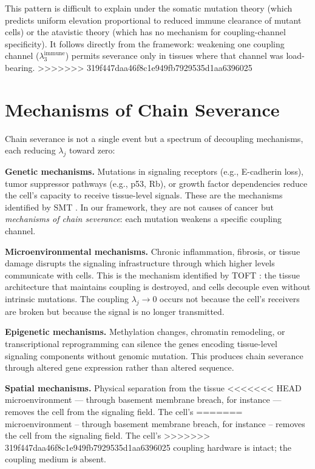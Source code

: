 \documentclass[11pt]{article}
\theoremstyle{definition}
\theoremstyle{remark}
\begin{document}
This pattern is difficult to explain under the somatic mutation
theory (which predicts uniform elevation proportional to reduced
immune clearance of mutant cells) or the atavistic theory (which
has no mechanism for coupling-channel specificity). It follows
directly from the framework: weakening one coupling channel
($\lambda_3^{\mathrm{immune}}$) permits severance only in tissues
where that channel was load-bearing.
\medskip
>>>>>>> 319f447daa46f8c1e949fb7929535d1aa6396025

\section{Mechanisms of Chain Severance}
\label{sec:mechanisms}

Chain severance is not a single event but a spectrum of decoupling
mechanisms, each reducing $\lambda_j$ toward zero:

\textbf{Genetic mechanisms.} Mutations in signaling receptors (e.g.,
E-cadherin loss), tumor suppressor pathways (e.g., p53, Rb), or
growth factor dependencies reduce the cell's capacity to receive
tissue-level signals. These are the mechanisms identified by SMT
\cite{Vogelstein2013}. In our framework, they are not causes of
cancer but \emph{mechanisms of chain severance}: each mutation
weakens a specific coupling channel.

\textbf{Microenvironmental mechanisms.} Chronic inflammation,
fibrosis, or tissue damage disrupts the signaling infrastructure
through which higher levels communicate with cells. This is the
mechanism identified by TOFT \cite{Sonnenschein2000}: the tissue
architecture that maintains coupling is destroyed, and cells
decouple even without intrinsic mutations. The coupling
$\lambda_j \to 0$ occurs not because the cell's receivers are
broken but because the signal is no longer transmitted.

\textbf{Epigenetic mechanisms.} Methylation changes, chromatin
remodeling, or transcriptional reprogramming can silence the
genes encoding tissue-level signaling components without genomic
mutation. This produces chain severance through altered gene
expression rather than altered sequence.

\textbf{Spatial mechanisms.} Physical separation from the tissue
<<<<<<< HEAD
microenvironment --- through basement membrane breach, for
instance --- removes the cell from the signaling field. The cell's
=======
microenvironment -- through basement membrane breach, for
instance -- removes the cell from the signaling field. The cell's
>>>>>>> 319f447daa46f8c1e949fb7929535d1aa6396025
coupling hardware is intact; the coupling medium is absent.
\end{document}

